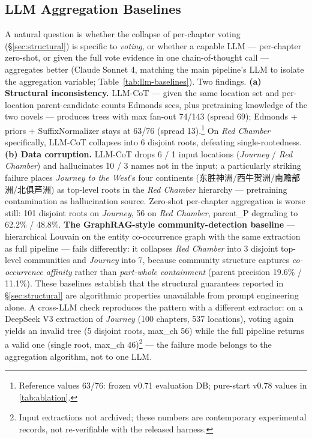 \documentclass[11pt]{article}
\newenvironment{CJK}[2]{}{}
\begin{document}
\subsection{LLM Aggregation Baselines}
\label{sec:llm-baselines}

A natural question is whether the collapse of per-chapter voting (\S\ref{sec:structural}) is specific to \textit{voting}, or whether a capable LLM --- per-chapter zero-shot, or given the full vote evidence in one chain-of-thought call --- aggregates better (Claude Sonnet 4, matching the main pipeline's LLM to isolate the aggregation variable; Table~\ref{tab:llm-baselines}).
Two findings. \textbf{(a) Structural inconsistency.} LLM-CoT --- given the same location set and per-location parent-candidate counts Edmonds sees, plus pretraining knowledge of the two novels --- produces trees with max fan-out 74/143 (spread 69); Edmonds + priors + SuffixNormalizer stays at 63/76 (spread 13).\footnote{Reference values 63/76: frozen v0.71 evaluation DB; pure-start v0.78 values in \autoref{tab:ablation}.} On \textit{Red Chamber} specifically, LLM-CoT collapses into 6 disjoint roots, defeating single-rootedness. \textbf{(b) Data corruption.} LLM-CoT drops 6 / 1 input locations (\textit{Journey} / \textit{Red Chamber}) and hallucinates 10 / 3 names not in the input; a particularly striking failure places \textit{Journey to the West}'s four continents (\begin{CJK}{UTF8}{gbsn}东胜神洲/西牛贺洲/南赡部洲/北俱芦洲\end{CJK}) as top-level roots in the \textit{Red Chamber} hierarchy --- pretraining contamination as hallucination source. Zero-shot per-chapter aggregation is worse still: 101 disjoint roots on \textit{Journey}, 56 on \textit{Red Chamber}, parent\_P degrading to 62.2\% / 48.8\%. \textbf{The GraphRAG-style community-detection baseline} --- hierarchical Louvain on the entity co-occurrence graph with the same extraction as full pipeline --- fails differently: it collapses \textit{Red Chamber} into 3 disjoint top-level communities and \textit{Journey} into 7, because community structure captures \emph{co-occurrence affinity} rather than \emph{part-whole containment} (parent precision 19.6\% / 11.1\%). These baselines establish that the structural guarantees reported in \S\ref{sec:structural} are algorithmic properties unavailable from prompt engineering alone. A cross-LLM check reproduces the pattern with a different extractor: on a DeepSeek V3 extraction of \textit{Journey} (100 chapters, 537 locations), voting again yields an invalid tree (5 disjoint roots, max\_ch 56) while the full pipeline returns a valid one (single root, max\_ch 46)\footnote{Input extractions not archived; these numbers are contemporary experimental records, not re-verifiable with the released harness.} --- the failure mode belongs to the aggregation algorithm, not to one LLM.
\end{document}
